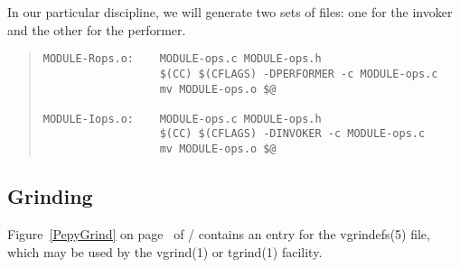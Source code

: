 In our particular discipline,
we will generate two sets of files:
one for the invoker and the other for the performer.
\begin{quote}\small\begin{verbatim}
MODULE-Rops.o:    MODULE-ops.c MODULE-ops.h
                  $(CC) $(CFLAGS) -DPERFORMER -c MODULE-ops.c
                  mv MODULE-ops.o $@

MODULE-Iops.o:    MODULE-ops.c MODULE-ops.h
                  $(CC) $(CFLAGS) -DINVOKER -c MODULE-ops.c
                  mv MODULE-ops.o $@
\end{verbatim}\end{quote}

\subsection	{Grinding}
Figure~\ref{PepyGrind} on page~\pageref{PepyGrind} of \volone/
contains an entry for the \man vgrindefs(5) file,
which may be used by the \man vgrind(1) or \man tgrind(1) facility.
